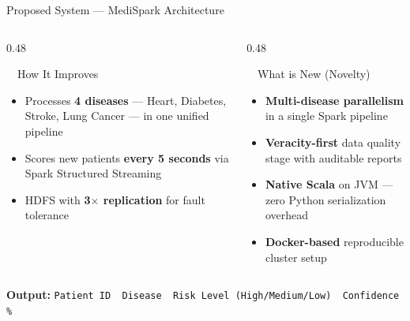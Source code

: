 \documentclass[aspectratio=169, 11pt]{beamer}
\begin{document}
\begin{frame}{Proposed System --- MediSpark Architecture}
\vspace{0.3cm}
\begin{columns}[T]
  \begin{column}{0.48\textwidth}
    \begin{exampleblock}{\ \ How It Improves}
      \begin{itemize}\small
        \item Processes \textbf{4 diseases} --- Heart, Diabetes, Stroke, Lung Cancer --- in one unified pipeline
        \item Scores new patients \textbf{every 5 seconds} via Spark Structured Streaming
        \item HDFS with \textbf{3$\times$ replication} for fault tolerance
      \end{itemize}
    \end{exampleblock}
  \end{column}
  \begin{column}{0.48\textwidth}
    \begin{exampleblock}{\ \ What is New (Novelty)}
      \begin{itemize}\small
        \item \textbf{Multi-disease parallelism} in a single Spark pipeline
        \item \textbf{Veracity-first} data quality stage with auditable reports
        \item \textbf{Native Scala} on JVM --- zero Python serialization overhead
        \item \textbf{Docker-based} reproducible cluster setup
      \end{itemize}
    \end{exampleblock}
  \end{column}
\end{columns}

\vspace{0.15cm}
\begin{center}
  {\small\textbf{Output:} \texttt{Patient ID \textbar\ Disease \textbar\ Risk Level (High/Medium/Low) \textbar\ Confidence \%}}
\end{center}

\end{frame}
\end{document}
